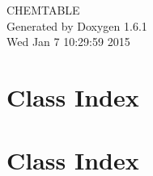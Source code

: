 \documentclass[a4paper]{book}
\begin{document}
\hypersetup{pageanchor=false}
\begin{titlepage}
\vspace*{7cm}
\begin{center}
{\Large CHEMTABLE }\\
\vspace*{1cm}
{\large Generated by Doxygen 1.6.1}\\
\vspace*{0.5cm}
{\small Wed Jan 7 10:29:59 2015}\\
\end{center}
\end{titlepage}
\clearemptydoublepage
{}
\tableofcontents
\clearemptydoublepage
{}
\hypersetup{pageanchor=true}
\chapter{Class Index}

\chapter{Class Index}

\end{document}
